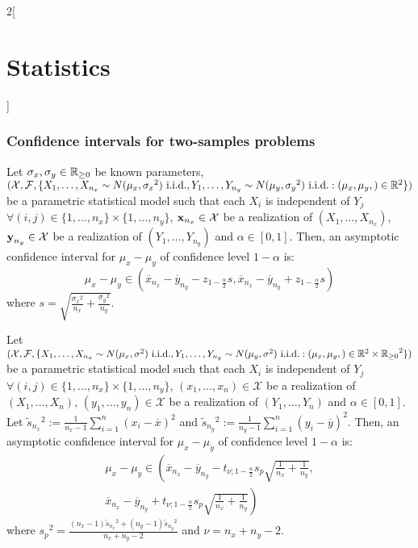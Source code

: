 \documentclass[../../../main.tex]{subfiles}
\begin{document}
\begin{multicols}{2}[\section{Statistics}]
  \subsubsection{Confidence intervals for two-samples problems}
  \begin{proposition}
    Let $\sigma_x,\sigma_y\in\mathbb{R}_{\geq 0}$ be known parameters, $(\mathcal{X},\mathcal{F},\{X_1,\ldots,X_{n_x}\sim N(\mu_x,{\sigma_x}^2)\text{ i.i.d.},Y_1,\ldots,Y_{n_y}\sim N(\mu_y,{\sigma_y}^2)\text{ i.i.d.}:(\mu_x,\mu_y,)\in\mathbb{R}^2\})$ be a parametric statistical model such that each $X_i$ is independent of $Y_j$ $\forall (i,j)\in\{1,\ldots,n_x\}\times\{1,\ldots,n_y\}$, $\boldsymbol{\mathrm{x}}_{n_x}\in\mathcal{X}$ be a realization of $(X_1,\ldots,X_{n_x})$, $\boldsymbol{\mathrm{y}}_{n_y}\in\mathcal{X}$ be a realization of $(Y_1,\ldots,Y_{n_y})$ and $\alpha\in[0,1]$. Then, an asymptotic confidence interval for $\mu_x-\mu_y$ of confidence level $1-\alpha$ is:
    $$\mu_x-\mu_y\in\left(\overline{x}_{n_x}-\overline{y}_{n_y}-z_{1-\frac{\alpha}{2}}s,\overline{x}_{n_x}-\overline{y}_{n_y}+z_{1-\frac{\alpha}{2}}s\right)$$ where $s=\sqrt{\frac{{\sigma_x}^2}{n_x}+\frac{{\sigma_y}^2}{n_y}}$.
  \end{proposition}
  \begin{proposition}
    Let $(\mathcal{X},\mathcal{F},\{X_1,\ldots,X_{n_x}\sim N(\mu_x,\sigma^2)\text{ i.i.d.},Y_1,\ldots,Y_{n_y}\sim N(\mu_y,\sigma^2)\text{ i.i.d.}:(\mu_x,\mu_y,)\in\mathbb{R}^2\times{\ensuremath{\mathbb{R}}_{\geq 0}}^2\})$ be a parametric statistical model such that each $X_i$ is independent of $Y_j$ $\forall (i,j)\in\{1,\ldots,n_x\}\times\{1,\ldots,n_y\}$, $(x_1,\ldots,x_n)\in\mathcal{X}$ be a realization of $(X_1,\ldots,X_{n})$, $(y_1,\ldots,y_n)\in\mathcal{X}$ be a realization of $(Y_1,\ldots,Y_{n})$ and $\alpha\in[0,1]$. Let $\tilde{s}_{n_x}{}^2:=\frac{1}{n_x-1}\sum_{i=1}^n{(x_i-\overline{x})}^2$ and $\tilde{s}_{n_y}{}^2:=\frac{1}{n_y-1}\sum_{i=1}^n{(y_i-\overline{y})}^2$. Then, an asymptotic confidence interval for $\mu_x-\mu_y$ of confidence level $1-\alpha$ is:
    \begin{multline*}
      \mu_x-\mu_y\in\left(\overline{x}_{n_x}-\overline{y}_{n_y}-t_{\nu;1-\frac{\alpha}{2}}s_p\sqrt{\frac{1}{n_x}+\frac{1}{n_y}},\right.\\\left.\overline{x}_{n_x}-\overline{y}_{n_y}+t_{\nu;1-\frac{\alpha}{2}}s_p\sqrt{\frac{1}{n_x}+\frac{1}{n_y}}\right)
    \end{multline*}
    where ${s_p}^2=\frac{(n_x-1)\tilde{s}_{n_x}{}^2+(n_y-1)\tilde{s}_{n_y}{}^2}{n_x+n_y-2}$ and $\nu=n_x+n_y-2$.

\end{proposition}
\end{multicols}
\end{document}
